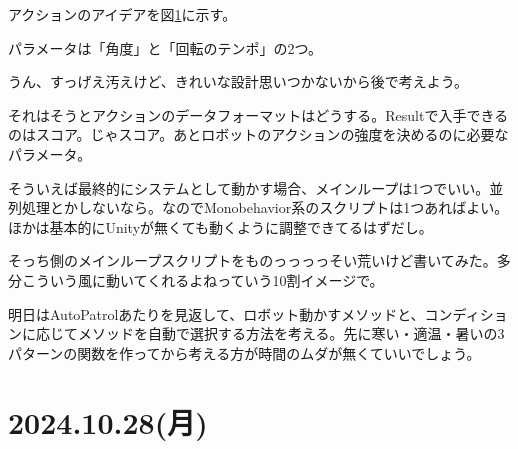 \documentclass[fleqn,twocolumn]{mynote}
\begin{document}
アクションのアイデアを図\ref{fig:weak-toio-action}に示す。

\fboxsep=0pt            %
\fboxrule=1pt            %
\begin{figure}[h]
  \centering
  \caption{}
  \label{fig:weak-toio-action}
\end{figure}

パラメータは「角度」と「回転のテンポ」の2つ。

うん、すっげえ汚えけど、きれいな設計思いつかないから後で考えよう。

それはそうとアクションのデータフォーマットはどうする。Resultで入手できるのはスコア。じゃスコア。あとロボットのアクションの強度を決めるのに必要なパラメータ。

そういえば最終的にシステムとして動かす場合、メインループは1つでいい。並列処理とかしないなら。なのでMonobehavior系のスクリプトは1つあればよい。ほかは基本的にUnityが無くても動くように調整できてるはずだし。

そっち側のメインループスクリプトをものっっっっそい荒いけど書いてみた。多分こういう風に動いてくれるよねっていう10割イメージで。

明日はAutoPatrolあたりを見返して、ロボット動かすメソッドと、コンディションに応じてメソッドを自動で選択する方法を考える。先に寒い・適温・暑いの3パターンの関数を作ってから考える方が時間のムダが無くていいでしょう。

\section*{2024.10.28(月)}
\end{document}
